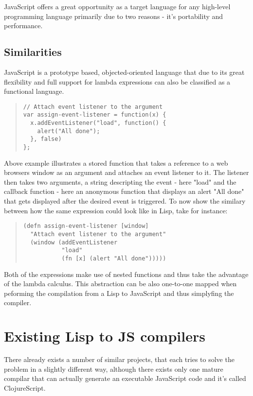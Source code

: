 JavaScript offers a great opportunity as a target language for any high-level programming language primarily due to two reasons - it's portability and performance.

\subsection{Similarities}
JavaScript is a prototype based, objected-oriented language that due to its great flexibility and full support for lambda expressions can also be classified as a functional language.
\begin{quote}
\begin{verbatim}
// Attach event listener to the argument
var assign-event-listener = function(x) {
  x.addEventListener("load", function() {
    alert("All done");
  }, false)
};
\end{verbatim}
\end{quote}

Above example illustrates a stored function that takes a reference to a web browsers window as an argument and attaches an event listener to it. The listener then takes two arguments, a string descripting the event - here "load" and the callback function - here an anonymous function that displays an alert "All done" that gets displayed after the desired event is triggered.
To now show the similary between how the same expression could look like in Lisp, take for instance:

\begin{quote}
\begin{verbatim}
(defn assign-event-listener [window]
  "Attach event listener to the argument"
  (window (addEventListener
           "load"
           (fn [x] (alert "All done")))))
\end{verbatim}
\end{quote}

Both of the expressions make use of nested functions and thus take the advantage of the lambda calculus. This abstraction can be also one-to-one mapped when peforming the compilation from a Lisp to JavaScript and thus simplyfing the compiler.

\section{Existing Lisp to JS compilers}
There already exists a number of similar projects, that each tries to solve the problem in a slightly different way, although there exists only one mature compilar that can actually generate an executable JavaScript code and it's called ClojureScript.

